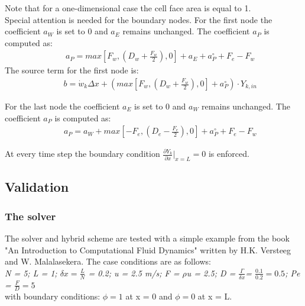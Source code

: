 Note that for a one-dimensional case the cell face area is equal to 1. \cite{Versteeg2007} \\
Special attention is needed for the boundary nodes. For the first node the coefficient $a_W$ is set to 0 and $a_E$ remains unchanged. The coefficient $a_P$ is computed as:
\begin{align}
&&	a_P =  max\left[F_w, \left(D_w + \frac{F_w}{2}\right),0\right] + a_E  + a^\circ_P + F_e - F_w
\end{align} 
The source term for the first node is:
\begin{align}
&& b = \dot{w}_k \Delta x + (max\left[F_w, \left(D_w + \frac{F_w}{2}\right),0\right] + a^\circ_P )\cdot Y_{k,in}	
\end{align}

For the last node the coefficient $a_E$ is set to 0 and $a_W$ remains unchanged. The coefficient $a_P$ is computed as:
\begin{align}
&&	a_P = a_W  + max\left[-F_e, \left(D_e - \frac{F_e}{2}\right),0\right] +  a^\circ_P + F_e - F_w
\end{align} 

At every time step the boundary condition $\frac{\partial Y_k}{\partial x}|_{x=L} = 0 $ is enforced.  

\subsection{Validation}
\subsubsection{The solver}
The solver and hybrid scheme are tested with a simple example from the book "An Introduction to Computational Fluid Dynamics" written by H.K. Versteeg and W. Malalasekera.\cite{Versteeg2007} The case conditions are as follows: \\

\textit{N = 5; L = 1; $\delta x = \frac{L}{N}$ = 0.2; u = 2.5 m/s; F = $\rho$u = 2.5; D = $\frac{\Gamma}{\delta x}$= $\frac{0.1}{0.2} = 0.5$; Pe = $\frac{F}{D} = 5$} \\
with boundary conditions: $\phi = 1$ at x = 0 and $\phi = 0$ at x = L.\\

